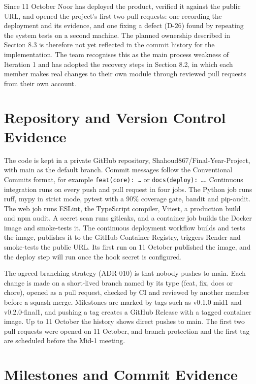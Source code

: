 \documentclass{fast-nuces-bs}
\begin{document}
Since 11 October Noor has deployed the product, verified it against the public URL, and opened the project's first two pull requests: one recording the deployment and its evidence, and one fixing a defect (D-26) found by repeating the system tests on a second machine. The planned ownership described in Section 8.3 is therefore not yet reflected in the commit history for the implementation. The team recognises this as the main process weakness of Iteration 1 and has adopted the recovery steps in Section 8.2, in which each member makes real changes to their own module through reviewed pull requests from their own account.

\section{Repository and Version Control Evidence}

The code is kept in a private GitHub repository, Shahoud867/Final-Year-Project, with main as the default branch. Commit messages follow the Conventional Commits format, for example \texttt{feat(\allowbreak{}core): \ldots{}} or \texttt{docs(\allowbreak{}deploy): \ldots{}}. Continuous integration runs on every push and pull request in four jobs. The Python job runs ruff, mypy in strict mode, pytest with a 90\% coverage gate, bandit and pip-audit. The web job runs ESLint, the TypeScript compiler, Vitest, a production build and npm audit. A secret scan runs gitleaks, and a container job builds the Docker image and smoke-tests it. The continuous deployment workflow builds and tests the image, publishes it to the GitHub Container Registry, triggers Render and smoke-tests the public URL. Its first run on 11 October published the image, and the deploy step will run once the hook secret is configured.

The agreed branching strategy (ADR-010) is that nobody pushes to main. Each change is made on a short-lived branch named by its type (feat, fix, docs or chore), opened as a pull request, checked by CI and reviewed by another member before a squash merge. Milestones are marked by tags such as v0.1.0-mid1 and v0.2.0-final1, and pushing a tag creates a GitHub Release with a tagged container image. Up to 11 October the history shows direct pushes to main. The first two pull requests were opened on 11 October, and branch protection and the first tag are scheduled before the Mid-1 meeting.

\section{Milestones and Commit Evidence}
\end{document}
